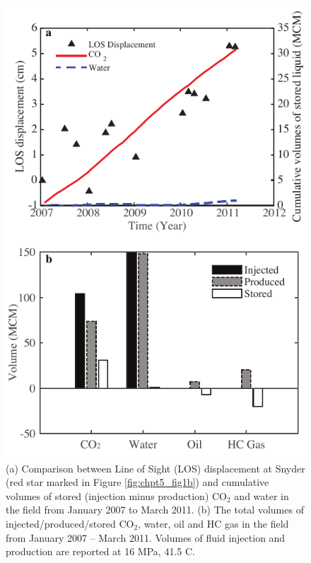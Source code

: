 \clearpage
\begin{figure}
	\centering
	\includegraphics{figs_paper3/Fig4.pdf}	
	\caption[(a) Comparison between Line of Sight (LOS) displacement at Snyder (red star marked in Figure \ref{fig:chpt5_fig1b}) and cumulative volumes of stored (injection minus production) CO$_{2}$ and water in the field from January 2007 to March 2011.  (b) The total volumes of injected/produced/stored CO$_{2}$, water, oil and HC gas in the field from January 2007 – March 2011.]{(a) Comparison between Line of Sight (LOS) displacement at Snyder (red star marked in Figure \ref{fig:chpt5_fig1b}) and cumulative volumes of stored (injection minus production) CO$_{2}$ and water in the field from January 2007 to March 2011.  (b) The total volumes of injected/produced/stored CO$_{2}$, water, oil and HC gas in the field from January 2007 – March 2011.  Volumes of fluid injection and production are reported at 16 MPa, 41.5 \textordmasculine C.}
	\label{fig:chpt5_fig4}
\end{figure}

